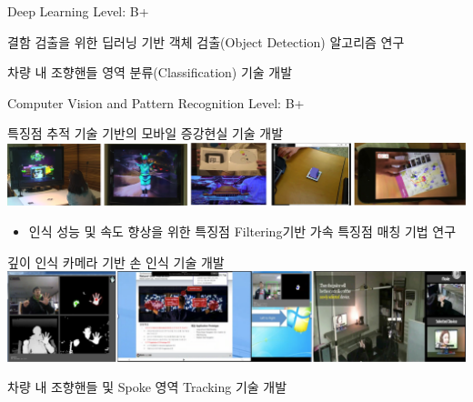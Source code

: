 


\begin{cventries}
  \cventry
    {Deep Learning} %
    {} %
    {} %
    {Level: B+} %
    {
      \begin{cvitems} %
        \item {결함 검출을 위한 딥러닝 기반 객체 검출(Object Detection) 알고리즘 연구}
        \item {차량 내 조향핸들 영역 분류(Classification) 기술 개발}
      \end{cvitems}
    }

  \cventry
    {Computer Vision and Pattern Recognition} %
    {} %
    {} %
    {Level: B+} %
    {
      \begin{cvitems} %
        \item {특징점 추적 기술 기반의 모바일 증강현실 기술 개발 \\
               \includegraphics[width=\linewidth]{resources/ar.png} }
          \begin{itemize}
            \item {인식 성능 및 속도 향상을 위한 특징점 Filtering기반 가속 특징점 매칭 기법 연구}
          \end{itemize}
        \item {깊이 인식 카메라 기반 손 인식 기술 개발 \\
               \includegraphics[width=\linewidth]{resources/hand.png} }
        \item {차량 내 조향핸들 및 Spoke 영역 Tracking 기술 개발}
      \end{cvitems}
    }


\end{cventries}
